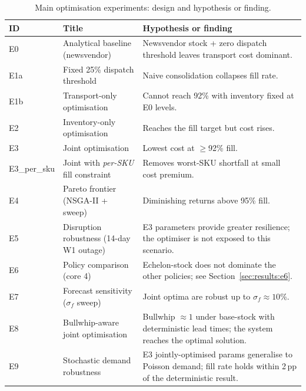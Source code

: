 \begin{table}[htbp]
  \centering
  \caption{Main optimisation experiments: design and hypothesis or finding.}
  \label{tab:exp-overview}
  \renewcommand{\arraystretch}{1.15}
  \small
  \begin{tabular}{@{}p{2.2cm}p{4.5cm}p{6.5cm}@{}}
    \toprule
    ID & Title & Hypothesis or finding \\
    \midrule
    E0          & Analytical baseline (newsvendor)          & Newsvendor stock + zero dispatch threshold leaves transport cost dominant. \\
    E1a         & Fixed 25\% dispatch threshold             & Naive consolidation collapses fill rate. \\
    E1b         & Transport-only optimisation               & Cannot reach 92\% with inventory fixed at E0 levels. \\
    E2          & Inventory-only optimisation               & Reaches the fill target but cost rises. \\
    E3          & Joint optimisation                        & Lowest cost at $\geq$92\% fill. \\
    E3\_per\_sku & Joint with \emph{per-SKU} fill constraint & Removes worst-SKU shortfall at small cost premium. \\
    E4          & Pareto frontier (NSGA-II + sweep)         & Diminishing returns above 95\% fill. \\
    E5          & Disruption robustness (14-day W1 outage)  & E3 parameters provide greater resilience; the optimiser is not exposed to this scenario. \\
    E6          & Policy comparison (core 4)                & Echelon-stock does not dominate the other policies; see Section~\ref{sec:results:e6}. \\
    E7          & Forecast sensitivity ($\sigma_f$ sweep)   & Joint optima are robust up to $\sigma_f \approx 10\%$. \\
    E8          & Bullwhip-aware joint optimisation         & Bullwhip $\approx 1$ under base-stock with deterministic lead times; the system reaches the optimal solution. \\
    E9          & Stochastic demand robustness              & E3 jointly-optimised params generalise to Poisson demand; fill rate holds within 2\,pp of the deterministic result. \\
    \bottomrule
  \end{tabular}
\end{table}

